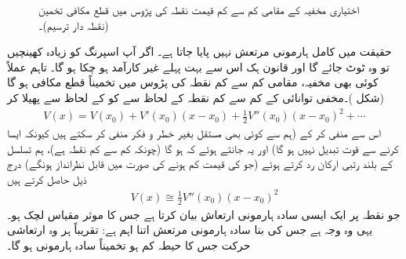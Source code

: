 \begin{figure}
\centering
{} 
\caption{اختیاری مخفیہ کے مقامی کم سے کم قیمت نقطہ کی پڑوس میں قطع مکافی تخمین (نقطہ دار ترسیم)۔}
\label{شکل_غیر_تابع_مقامی_کم_سے_کم_قطع_مکافی}
\end{figure}

حقیقت میں کامل ہارمونی مرتعش نہیں پایا جاتا ہے۔ اگر آپ اسپرنگ کو زیادہ  کھینچیں تو وہ  ٹوٹ جائے گا اور قانون ہک اس سے بہت پہلے غیر کارآمد ہو چکا ہو گا۔ تاہم عملاً کوئی بھی مخفیہ، مقامی کم سے کم نقطہ کی پڑوس میں تخمیناً قطع مکافی
  ہو گا (شکل )۔مخفی توانائی  کے کم سے کم نقطہ  کے لحاظ سے  کو  کے لحاظ سے پھیلا کر
\begin{align*}
V(x)=V( x_{0})+V'(x_{0})(x-x_{0})+\frac{1}{2}V''(x_{0})(x-x_{0})^{2}+\cdots
\end{align*}
اس سے  منفی کر کے (ہم  سے کوئی بھی مستقل بغیر خطر و فکر منفی کر سکتے ہیں کیونکہ ایسا کرنے  سے قوت تبدیل نہیں ہو گا)  اور یہ جانتے ہوئے کہ  ہو گا (چونکہ  کم سے کم نقطہ ہے)، ہم تسلسل کے بلند رتبی ارکان  رد کرتے ہوئے (جو  کی قیمت کم ہونے کی صورت میں قابل نظرانداز ہونگے) درج ذیل حاصل کرتے ہیں
\begin{align*}
V(x)\cong\frac{1}{2}V''(x_{0})(x-x_{0})^{2}
\end{align*}
جو نقطہ  پر ایک ایسی سادہ  ہارمونی ارتعاش  بیان کرتا ہے  جس کا موثر مقیاس لچک  ہو۔ یہی وہ وجہ ہے جس کی بنا سادہ ہارمونی مرتعش اتنا اہم ہے: تقریباً ہر وہ ارتعاشی حرکت جس کا حیطہ کم ہو تخمیناً سادہ ہارمونی ہو گا۔

